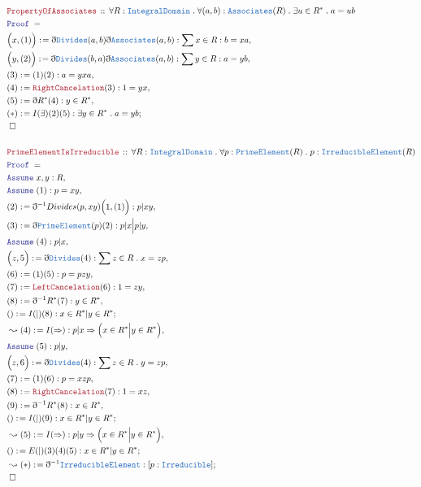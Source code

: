 \documentclass[12pt]{scrartcl}
\newcommand{\TYPE}[1]{\textcolor{NavyBlue}{\mathtt{#1}}}
\newcommand{\LOGIC}[1]{\textcolor{Blue}{\mathtt{#1}}}
\newcommand{\THM}[1]{\textcolor{Maroon}{\mathtt{#1}}}
\renewcommand{\.}{\; . \;}
\newcommand{\de}{: \kern 0.1pc =}
\newcommand{\Theorem}[2]{& \THM{#1} \, :: \, #2 \\ & \Proof = \\ }
\newcommand{\Page}[1]{ \begin{align*} #1 \end{align*}   }
\newcommand{ \bd }{ \ByDef }
\newcommand{\Say}[3]{& #1 \de #2 : #3, \\}
\newcommand{\Conclude}[3]{& #1 \de #2 : #3; \\}
\newcommand{\Derive}[3]{& \leadsto #1 \de #2 : #3, \\}
\newcommand{\DeriveConclude}[3]{& \leadsto #1 \de #2 : #3 ; \\}
\newcommand{\Assume}[2]{& \LOGIC{Assume} \; #1 : #2, \\}
\newcommand{\QED}{\; \square}
\newcommand{\EndProof}{& \QED \\}
\newcommand{\ByDef}{\eth}
\newcommand{\Proof}{\LOGIC{Proof} \; }
\newcommand{\ID}{\TYPE{IntegralDomain}}
\begin{document}
\Page{
	\Theorem{PropertyOfAssociates}{\forall R : \ID \. \forall (a,b) : \TYPE{Associates}(R) \.  \exists u \in R^* \. a = ub}
	\Say{\Big(x,(1)\Big)}{\bd \TYPE{Divides}(a,b)\bd \TYPE{Associates}(a,b)}{ \sum x \in R : b = xa }
	\Say{\Big(y,(2)\Big)}{\bd \TYPE{Divides}(b,a)\bd \TYPE{Associates}(a,b)}{ \sum y \in R : a = yb }
	\Say{(3)}{(1)(2)}{a = yxa}
	\Say{(4)}{\THM{RightCancelation}(3)}{1 = yx}
	\Say{(5)}{\bd R^*(4)}{y \in R^*}
	\Conclude{(*)}{I(\exists)(2)(5) }{ \exists y \in R^* \. a = yb}
	\EndProof
	\\
	\Theorem{PrimeElementIsIrreducible}{\forall R : \ID \. \forall p : \TYPE{PrimeElement}(R) \. p : \TYPE{IrreducibleElement}(R)}
	\Assume{x,y}{R}
	\Assume{(1)}{p = xy}
	\Say{(2)}{\bd^{-1} Divides(p,xy)\Big(1,(1)\Big)}{ p | xy  }
	\Say{(3)}{\bd \TYPE{PrimeElement}(p)(2) }{p|x \Big| p|y}
	\Assume{(4)}{p|x}
	\Say{\Big(z,5\Big)}{ \bd \TYPE{Divides}(4)   }{  \sum z \in R \.  x =  zp }
	\Say{(6)}{(1)(5)}{ p = pzy   }
	\Say{(7)}{\THM{LeftCancelation}(6)}{ 1 = zy }
	\Say{(8)}{\bd^{-1} R^*(7)}{y \in R^*}
	\Conclude{()}{I(|)(8)}{x \in R^*|y \in R^*}
	\Derive{(4)}{I(\Rightarrow)}{ p|x \Rightarrow \Big(   x \in R^* \Big| y \in R^* \Big)}
	\Assume{(5)}{p|y}
	\Say{\Big(z,6\Big)}{ \bd \TYPE{Divides}(4)   }{  \sum z \in R \.  y =  zp }
	\Say{(7)}{(1)(6)}{ p = xzp   }
	\Say{(8)}{\THM{RightCancelation}(7)}{ 1 = xz }
	\Say{(9)}{\bd^{-1} R^*(8)}{x \in R^*}
	\Conclude{()}{I(|)(9)}{x \in R^*|y \in R^*}
	\Derive{(5)}{I(\Rightarrow)}{p|y \Rightarrow \Big( x \in R^* \Big| y \in R^*\Big) }
	\Conclude{()}{E(|)(3)(4)(5)}{x \in R^* | y \in R^*}
	\DeriveConclude{(*)}{\bd^{-1}\TYPE{IrreducibleElement}}{[p : \TYPE{Irreducible}]  }
	\EndProof
}
\newpage
\end{document}
